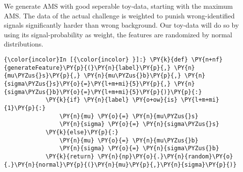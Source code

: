     We generate AMS with good seperable toy-data, starting with the maximum
AMS. The data of the actual challenge is weighted to punish
wrong-identified signals significantly harder than wrong background. Our
toy-data will do so by using its signal-probability as weight, the
features are randomized by normal distributions.

    \begin{Verbatim}[commandchars=\\\{\}]
{\color{incolor}In [{\color{incolor} }]:} \PY{k}{def} \PY{n+nf}{generateFeature}\PY{p}{(}\PY{n}{label}\PY{p}{,} \PY{n}{mu\PYZus{}s}\PY{p}{,} \PY{n}{mu\PYZus{}b}\PY{p}{,} \PY{n}{sigma\PYZus{}s}\PY{o}{=}\PY{l+m+mi}{5}\PY{p}{,} \PY{n}{sigma\PYZus{}b}\PY{o}{=}\PY{l+m+mi}{5}\PY{p}{)}\PY{p}{:}
            \PY{k}{if} \PY{n}{label} \PY{o+ow}{is} \PY{l+m+mi}{1}\PY{p}{:}
                \PY{n}{mu} \PY{o}{=} \PY{n}{mu\PYZus{}s}
                \PY{n}{sigma} \PY{o}{=} \PY{n}{sigma\PYZus{}s}
            \PY{k}{else}\PY{p}{:}
                \PY{n}{mu} \PY{o}{=} \PY{n}{mu\PYZus{}b}
                \PY{n}{sigma} \PY{o}{=} \PY{n}{sigma\PYZus{}b}
            \PY{k}{return} \PY{n}{np}\PY{o}{.}\PY{n}{random}\PY{o}{.}\PY{n}{normal}\PY{p}{(}\PY{n}{mu}\PY{p}{,}\PY{n}{sigma}\PY{p}{)}
\end{Verbatim}

